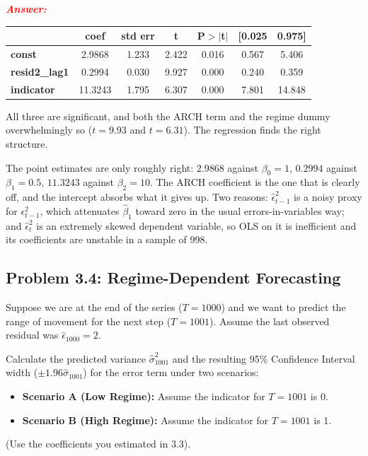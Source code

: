 \documentclass[11pt, letterpaper]{article}
\newcommand{\subproblem}[1]{\subsection*{Problem #1}}
\newcommand{\answer}{\textbf{\textit{\textcolor{red}{Answer:}}}\\}
\begin{document}
\answer
\begin{center}
\begin{tabular}{lcccccc}
\toprule
                      & \textbf{coef} & \textbf{std err} & \textbf{t} & \textbf{P$> |$t$|$} & \textbf{[0.025} & \textbf{0.975]}  \\
\midrule
\textbf{const}        &       2.9868  &        1.233     &     2.422  &         0.016        &        0.567    &        5.406     \\
\textbf{resid2\_lag1} &       0.2994  &        0.030     &     9.927  &         0.000        &        0.240    &        0.359     \\
\textbf{indicator}    &      11.3243  &        1.795     &     6.307  &         0.000        &        7.801    &       14.848     \\
\bottomrule
\end{tabular}
\end{center}

All three are significant, and both the ARCH term and the regime dummy overwhelmingly so
($t = 9.93$ and $t = 6.31$). The regression finds the right structure.

The point estimates are only roughly right: $2.9868$ against $\beta_0 = 1$, $0.2994$ against
$\beta_1 = 0.5$, $11.3243$ against $\beta_2 = 10$. The ARCH coefficient is the one that is clearly
off, and the intercept absorbs what it gives up. Two reasons: $\hat{\epsilon}_{t-1}^2$ is a noisy
proxy for $\epsilon_{t-1}^2$, which attenuates $\hat{\beta}_1$ toward zero in the usual
errors-in-variables way; and $\hat{\epsilon}_t^2$ is an extremely skewed dependent variable, so OLS
on it is inefficient and its coefficients are unstable in a sample of 998.


\subproblem{3.4: Regime-Dependent Forecasting}
Suppose we are at the end of the series ($T=1000$) and we want to predict the range of movement for the next step ($T=1001$).
Assume the last observed residual was $\hat{\epsilon}_{1000} = 2$.

Calculate the predicted variance $\hat{\sigma}_{1001}^2$ and the resulting 95\% Confidence Interval width ($\pm 1.96 \hat{\sigma}_{1001}$) for the error term under two scenarios:
\begin{itemize}
    \item \textbf{Scenario A (Low Regime):} Assume the indicator for $T=1001$ is 0.
    \item \textbf{Scenario B (High Regime):} Assume the indicator for $T=1001$ is 1.
\end{itemize}
(Use the coefficients you estimated in 3.3).
\end{document}
